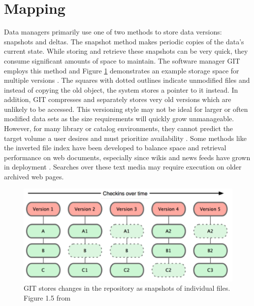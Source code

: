 \section{Mapping}

Data managers primarily use one of two methods to store data versions: snapshots and deltas.
The snapshot method makes periodic copies of the data's current state.
While storing and retrieve these snapshots can be very quick, they consume significant amounts of space to maintain.
The software manager GIT employs this method and Figure \ref{GITFile} demonstrates an example storage space for multiple versions \cite{Chacon:2009:PG:1618548}.
The squares with dotted outlines indicate unmodified files and instead of copying the old object, the system stores a pointer to it instead.
In addition, GIT compresses and separately stores very old versions which are unlikely to be accessed.
This versioning style may not be ideal for larger or often modified data sets as the size requirements will quickly grow unmanageable.
However, for many library or catalog environments, they cannot predict the target volume a user desires and must prioritize availability \cite{Payette2002} \cite{Barkstrom_digitallibrary}.
Some methods like the inverted file index have been developed to balance space and retrieval performance on web documents, especially since wikis and news feeds have grown in deployment \cite{Berberich:2007:TMT:1277741.1277831}.
Searches over these text media may require execution on older archived web pages.

\begin{figure}
	\centering
	\includegraphics[scale=0.50]{figures/GITFiles.png}
	\caption[GIT stores changes in the repository as snapshots of individual files.]{GIT stores changes in the repository as snapshots of individual files. Figure 1.5 from \cite{Chacon:2009:PG:1618548}}
	\label{GITFile}
\end{figure}

